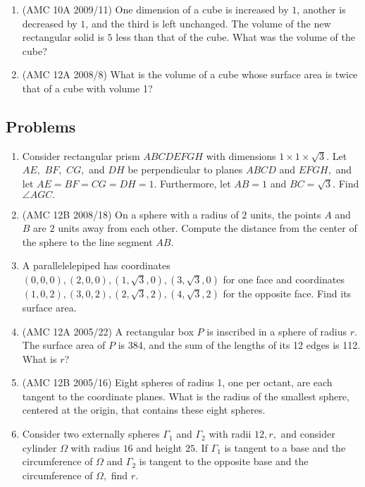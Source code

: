 \begin{enumerate}
\item (AMC 10A 2009/11) One dimension of a cube is increased by $1$, another is decreased by $1$, and the third is left unchanged. The volume of the new rectangular solid is $5$ less than that of the cube. What was the volume of the cube?

\item (AMC 12A 2008/8) What is the volume of a cube whose surface area is twice that of a cube with volume 1?
\end{enumerate}

\subsection{Problems}

\begin{enumerate}
\item Consider rectangular prism $ABCDEFGH$ with dimensions $1 \times 1 \times \sqrt{3}.$ Let $AE,$ $BF,$ $CG,$ and $DH$ be perpendicular to planes $ABCD$ and $EFGH,$ and let $AE = BF = CG = DH = 1.$ Furthermore, let $AB = 1$ and $BC = \sqrt{3}.$ Find $\angle AGC.$

\item (AMC 12B 2008/18) On a sphere with a radius of $2$ units, the points $A$ and $B$ are $2$ units away from each other. Compute the distance from the center of the sphere to the line segment $AB.$

\item A parallelelepiped has coordinates $(0,0,0),(2,0,0),(1,\sqrt{3},0),(3,\sqrt{3},0)$ for one face and coordinates $(1,0,2),(3,0,2),(2,\sqrt{3},2),(4,\sqrt{3},2)$ for the opposite face. Find its surface area.

\item (AMC 12A 2005/22) A rectangular box $P$ is inscribed in a sphere of radius $r$. The surface area of $P$ is 384, and the sum of the lengths of its 12 edges is 112. What is $r$?

\item (AMC 12B 2005/16) Eight spheres of radius 1, one per octant, are each tangent to the coordinate planes. What is the radius of the smallest sphere, centered at the origin, that contains these eight spheres.

\item Consider two externally spheres $\Gamma_1$ and $\Gamma_2$ with radii $12,r,$ and consider cylinder $\Omega$ with radius $16$ and height $25.$ If $\Gamma_1$ is tangent to a base and the circumference of $\Omega$ and $\Gamma_2$ is tangent to the opposite base and the circumference of $\Omega,$ find $r.$


\end{enumerate}
